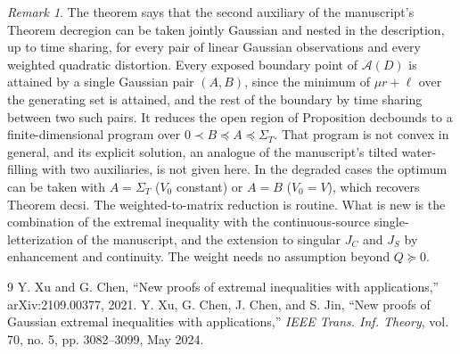 \documentclass[11pt]{article}
\theoremstyle{remark}
\newtheorem{remark}{Remark}
\begin{document}
\begin{remark}
The theorem says that the second auxiliary of the manuscript's Theorem decregion can be taken jointly Gaussian and nested in the description, up to time sharing, for every pair of linear Gaussian observations and every weighted quadratic distortion. Every exposed boundary point of $\mathcal A(D)$ is attained by a single Gaussian pair $(A,B)$, since the minimum of $\mu r+\ell$ over the generating set is attained, and the rest of the boundary by time sharing between two such pairs. It reduces the open region of Proposition decbounds to a finite-dimensional program over $0\prec B\preceq A\preceq\Sigma_T$. That program is not convex in general, and its explicit solution, an analogue of the manuscript's tilted water-filling with two auxiliaries, is not given here. In the degraded cases the optimum can be taken with $A=\Sigma_T$ ($V_0$ constant) or $A=B$ ($V_0=V$), which recovers Theorem decsi. The weighted-to-matrix reduction is routine. What is new is the combination of the extremal inequality with the continuous-source single-letterization of the manuscript, and the extension to singular $J_C$ and $J_S$ by enhancement and continuity. The weight needs no assumption beyond $Q\succeq0$.
\end{remark}

\begin{thebibliography}{9}
 Y. Xu and G. Chen, ``New proofs of extremal inequalities with applications,'' arXiv:2109.00377, 2021.
 Y. Xu, G. Chen, J. Chen, and S. Jin, ``New proofs of Gaussian extremal inequalities with applications,'' \emph{IEEE Trans. Inf. Theory}, vol. 70, no. 5, pp. 3082--3099, May 2024.
\end{thebibliography}
\end{document}
